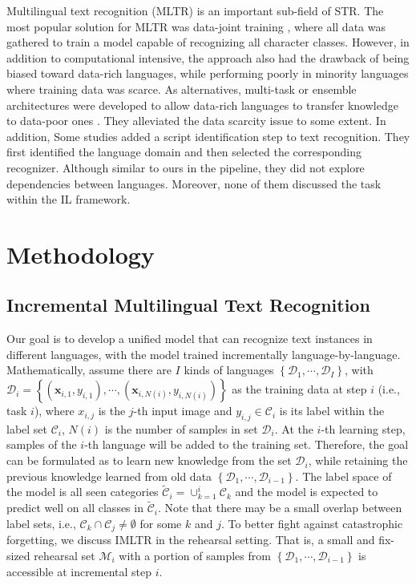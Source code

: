 \documentclass[10pt,twocolumn,letterpaper]{article}
\begin{document}
Multilingual text recognition (MLTR) is an important sub-field of STR. The most popular solution for MLTR was data-joint training \cite{nayef2017mlt2017,buvsta2018e2emlt,nayef2019mlt2019,baek2020crafts}, where all data was gathered to train a model capable of recognizing all character classes. However, in addition to computational intensive, the approach also had the drawback of being biased toward data-rich languages, while performing poorly in minority languages where training data was scarce. As alternatives, multi-task or ensemble architectures were developed to allow data-rich languages to transfer knowledge to data-poor ones \cite{bai2014image,cui2017multilingual}. They alleviated the data scarcity issue to some extent. In addition, Some studies \cite{fujii2017seqscript,gomez2017improving,shi2015automatic,huang2021multiocr} added a script identification step to text recognition. They first identified the language domain and then selected the corresponding recognizer. Although similar to ours in the pipeline, they did not explore dependencies between languages. Moreover, none of them discussed the task within the IL framework.

\section{Methodology}
\subsection{Incremental Multilingual Text Recognition}
Our goal is to develop a unified model that can recognize text instances in different languages, with the model trained incrementally language-by-language. Mathematically, assume there are $I$ kinds of languages $\left\{\mathcal{D}_{1}, \cdots, \mathcal{D}_{I}\right\}$, with $\mathcal{D}_{i}=\left\{\left(\mathbf{x}_{i,1}, y_{i,1}\right), \cdots,\left(\mathbf{x}_{i,N(i)}, y_{i,N(i)}\right)\right\}$ as the training data at step $i$ (i.e., task $i$), where ${x}_{i,j}$ is the $j$-th input image and $y_{i, j} \in \mathcal{C}_{i}$ is its label within the label set $\mathcal{C}_{i}$, $N(i)$ is the number of samples in set $\mathcal{D}_{i}$. At the $i$-th learning step, samples of the $i$-th language will be added to the training set. Therefore, the goal can be formulated as to learn new knowledge from the set $\mathcal{D}_{i}$, while retaining the previous knowledge learned from old data $\left\{\mathcal{D}_{1}, \cdots, \mathcal{D}_{i-1}\right\}$. The label space of the model is all seen categories $\tilde{\mathcal{C}}_{i}=\cup_{k=1}^{i} \mathcal{C}_{k}$ and the model is expected to predict well on all classes in $\tilde{\mathcal{C}}_{i}$. Note that there may be a small overlap between label sets, i.e., $\mathcal{C}_{k} \cap \mathcal{C}_{j} \neq\emptyset$ for some $k$ and $j$. To better fight against catastrophic forgetting, we discuss IMLTR in the rehearsal setting. That is, a small and fix-sized rehearsal set $\mathcal{M}_i$ with a portion of samples from $\left\{\mathcal{D}_{1}, \cdots, \mathcal{D}_{i-1}\right\}$ is accessible at incremental step $i$. 
\end{document}
